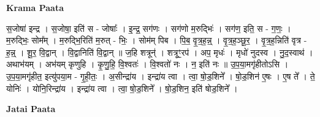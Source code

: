\documentclass[17pt]{extarticle}
\begin{document}
\textbf{Krama Paata} \newline

स॒जोषा॑ इन्द्र । स॒जोषा॒ इति॑ स - जोषाः᳚ । इ॒न्द्र॒ सग॑णः । सग॑णो म॒रुद्भिः॑ । सग॑ण॒ इति॒ स - ग॒णः॒ । म॒रुद्भिः॒ सोम᳚म् । म॒रुद्भि॒रिति॑ म॒रुत् - भिः॒ । सोम॑म् पिब । पि॒ब॒ वृ॒त्र॒ह॒न्न्॒ । वृ॒त्र॒ह॒ञ्छू॒र॒ । वृ॒त्र॒ह॒न्निति॑ वृत्र - ह॒न्न्॒ । शू॒र॒ वि॒द्वान् । वि॒द्वानिति॑ वि॒द्वान् ॥ ज॒हि शत्रून्॑ । शत्रूꣳ॒॒रप॑ । अप॒ मृधः॑ । मृधो॑ नुदस्व । नु॒द॒स्वाथ॑ । अथाभ॑यम् । अभ॑यम् कृणुहि । कृ॒णु॒हि॒ वि॒श्वतः॑ । वि॒श्वतो॑ नः । न॒ इति॑ नः ॥ उ॒प॒या॒मगृ॑हीतोऽसि । उ॒प॒या॒मगृ॑हीत॒ इत्यु॑पया॒म - गृ॒ही॒तः॒ । अ॒सीन्द्रा॑य । इन्द्रा॑य त्वा । त्वा॒ षो॒ड॒शिने᳚ । षो॒ड॒शिन॑ ए॒षः । ए॒ष ते᳚ । ते॒ योनिः॑ । योनि॒रिन्द्रा॑य । इन्द्रा॑य त्वा । त्वा॒ षो॒ड॒शिने᳚ । षो॒ड॒शिन॒ इति॑ षोड॒शिने᳚ । \newline

\textbf{Jatai Paata} \newline
\end{document}
